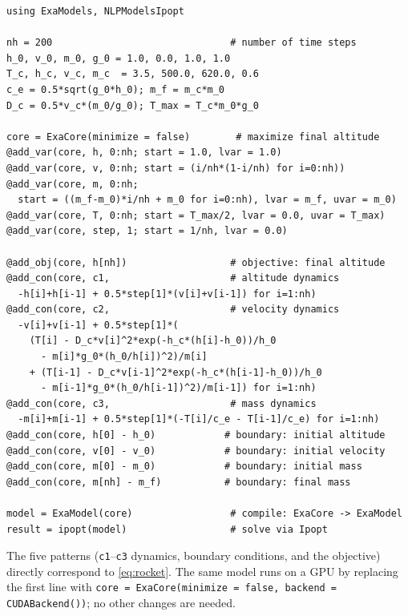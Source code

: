 \documentclass[11pt]{article}
\begin{document}
\begin{lstlisting}
using ExaModels, NLPModelsIpopt

nh = 200                               # number of time steps
h_0, v_0, m_0, g_0 = 1.0, 0.0, 1.0, 1.0
T_c, h_c, v_c, m_c  = 3.5, 500.0, 620.0, 0.6
c_e = 0.5*sqrt(g_0*h_0); m_f = m_c*m_0
D_c = 0.5*v_c*(m_0/g_0); T_max = T_c*m_0*g_0

core = ExaCore(minimize = false)        # maximize final altitude
@add_var(core, h, 0:nh; start = 1.0, lvar = 1.0)
@add_var(core, v, 0:nh; start = (i/nh*(1-i/nh) for i=0:nh))
@add_var(core, m, 0:nh;
  start = ((m_f-m_0)*i/nh + m_0 for i=0:nh), lvar = m_f, uvar = m_0)
@add_var(core, T, 0:nh; start = T_max/2, lvar = 0.0, uvar = T_max)
@add_var(core, step, 1; start = 1/nh, lvar = 0.0)

@add_obj(core, h[nh])                  # objective: final altitude
@add_con(core, c1,                     # altitude dynamics
  -h[i]+h[i-1] + 0.5*step[1]*(v[i]+v[i-1]) for i=1:nh)
@add_con(core, c2,                     # velocity dynamics
  -v[i]+v[i-1] + 0.5*step[1]*(
    (T[i] - D_c*v[i]^2*exp(-h_c*(h[i]-h_0))/h_0
      - m[i]*g_0*(h_0/h[i])^2)/m[i]
    + (T[i-1] - D_c*v[i-1]^2*exp(-h_c*(h[i-1]-h_0))/h_0
      - m[i-1]*g_0*(h_0/h[i-1])^2)/m[i-1]) for i=1:nh)
@add_con(core, c3,                     # mass dynamics
  -m[i]+m[i-1] + 0.5*step[1]*(-T[i]/c_e - T[i-1]/c_e) for i=1:nh)
@add_con(core, h[0] - h_0)            # boundary: initial altitude
@add_con(core, v[0] - v_0)            # boundary: initial velocity
@add_con(core, m[0] - m_0)            # boundary: initial mass
@add_con(core, m[nh] - m_f)           # boundary: final mass

model = ExaModel(core)                 # compile: ExaCore -> ExaModel
result = ipopt(model)                  # solve via Ipopt
\end{lstlisting}
The five patterns (\texttt{c1}--\texttt{c3} dynamics, boundary conditions, and the objective) directly correspond to \cref{eq:rocket}. The same model runs on a GPU by replacing the first line with \texttt{core = ExaCore(minimize = false, backend = CUDABackend())}; no other changes are needed.
\end{document}
